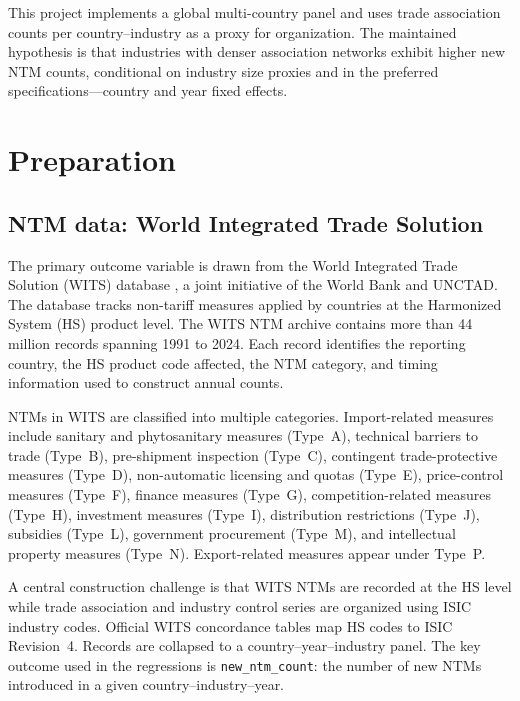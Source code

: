 \documentclass[12pt,letterpaper]{article}
\begin{document}
This project implements a global multi-country panel and uses trade association counts per country--industry as a proxy for organization. The maintained hypothesis is that industries with denser association networks exhibit higher new NTM counts, conditional on industry size proxies and in the preferred specifications---country and year fixed effects.

\section{Preparation}

\subsection{NTM data: World Integrated Trade Solution}

The primary outcome variable is drawn from the World Integrated Trade Solution (WITS) database \citep{wits2024}, a joint initiative of the World Bank and UNCTAD. The database tracks non-tariff measures applied by countries at the Harmonized System (HS) product level. The WITS NTM archive contains more than 44 million records spanning 1991 to 2024. Each record identifies the reporting country, the HS product code affected, the NTM category, and timing information used to construct annual counts.

NTMs in WITS are classified into multiple categories. Import-related measures include sanitary and phytosanitary measures (Type~A), technical barriers to trade (Type~B), pre-shipment inspection (Type~C), contingent trade-protective measures (Type~D), non-automatic licensing and quotas (Type~E), price-control measures (Type~F), finance measures (Type~G), competition-related measures (Type~H), investment measures (Type~I), distribution restrictions (Type~J), subsidies (Type~L), government procurement (Type~M), and intellectual property measures (Type~N). Export-related measures appear under Type~P.

A central construction challenge is that WITS NTMs are recorded at the HS level while trade association and industry control series are organized using ISIC industry codes. Official WITS concordance tables map HS codes to ISIC Revision~4. Records are collapsed to a country--year--industry panel. The key outcome used in the regressions is \texttt{new\_ntm\_count}: the number of new NTMs introduced in a given country--industry--year.
\end{document}
